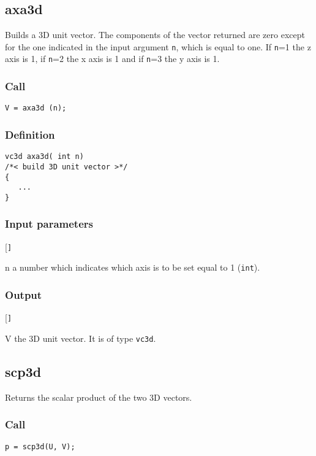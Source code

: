 \subsection{{axa3d}}
Builds a 3D unit vector. The components of the vector returned are zero except for the one indicated in the input argument \texttt{n}, which is equal to one. If \texttt{n}=1 the z axis is 1, if \texttt{n}=2 the x axis is 1 and if \texttt{n}=3 the y axis is 1.

\subsubsection*{Call}
\begin{verbatim}V = axa3d (n);\end{verbatim}

\subsubsection*{Definition}
\begin{verbatim}
vc3d axa3d( int n)
/*< build 3D unit vector >*/
{
   ...
}
\end{verbatim}

\subsubsection*{Input parameters}
\begin{desclist}{\tt }{\quad}[\tt ]
   \setlength\itemsep{0pt}
   \item[n] a number which indicates which axis is to be set equal to 1 (\texttt{int}).     
\end{desclist}

\subsubsection*{Output}
\begin{desclist}{\tt }{\quad}[\tt ]
   \setlength\itemsep{0pt}
   \item[V] the 3D unit vector. It is of type \texttt{vc3d}.
\end{desclist}




\subsection{{scp3d}}
Returns the scalar product of the two 3D vectors.

\subsubsection*{Call}
\begin{verbatim}p = scp3d(U, V);\end{verbatim}

